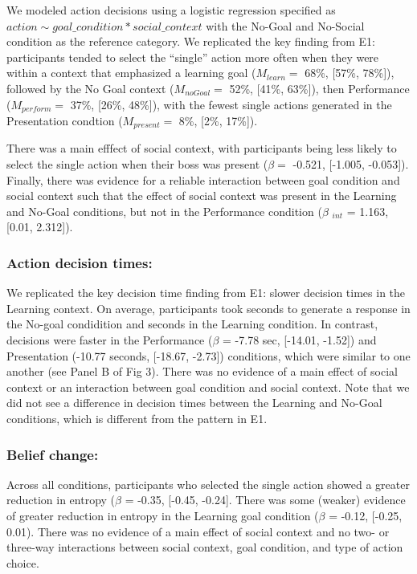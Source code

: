 \documentclass[10pt, letterpaper]{article}
\begin{document}
We modeled action decisions using a logistic regression specified as
\texttt{$action \sim goal\_condition * social\_context$} with the
No-Goal and No-Social condition as the reference category. We replicated
the key finding from E1: participants tended to select the ``single''
action more often when they were within a context that emphasized a
learning goal (\(M_{learn} =\) 68\%, {[}57\%, 78\%{]}), followed by the
No Goal context (\(M_{noGoal} =\) 52\%, {[}41\%, 63\%{]}), then
Performance (\(M_{perform} =\) 37\%, {[}26\%, 48\%{]}), with the fewest
single actions generated in the Presentation condtion (\(M_{present} =\)
8\%, {[}2\%, 17\%{]}).

There was a main efffect of social context, with participants being less
likely to select the single action when their boss was present
(\(\beta =\) -0.521, {[}-1.005, -0.053{]}). Finally, there was evidence
for a reliable interaction between goal condition and social context
such that the effect of social context was present in the Learning and
No-Goal conditions, but not in the Performance condition (\(\beta\)
\(_{int}\) = 1.163, {[}0.01, 2.312{]}).

\subsubsection{Action decision times:}\label{action-decision-times-1}

We replicated the key decision time finding from E1: slower decision
times in the Learning context. On average, participants took seconds to
generate a response in the No-goal condidition and seconds in the
Learning condition. In contrast, decisions were faster in the
Performance (\(\beta\) = -7.78 sec, {[}-14.01, -1.52{]}) and
Presentation (-10.77 seconds, {[}-18.67, -2.73{]}) conditions, which
were similar to one another (see Panel B of Fig 3). There was no
evidence of a main effect of social context or an interaction between
goal condition and social context. Note that we did not see a difference
in decision times between the Learning and No-Goal conditions, which is
different from the pattern in E1.

\subsubsection{Belief change:}\label{belief-change-1}

Across all conditions, participants who selected the single action
showed a greater reduction in entropy (\(\beta\) = -0.35, {[}-0.45,
-0.24{]}. There was some (weaker) evidence of greater reduction in
entropy in the Learning goal condition (\(\beta\) = -0.12, {[}-0.25,
0.01). There was no evidence of a main effect of social context and no
two- or three-way interactions between social context, goal condition,
and type of action choice.
\end{document}
